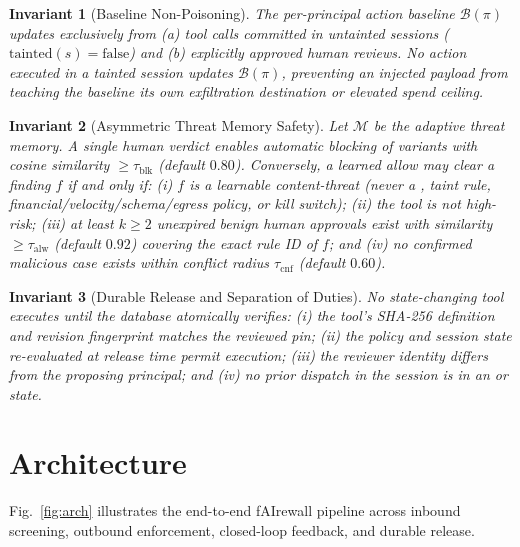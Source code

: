\documentclass[conference]{IEEEtran}
\newtheorem{invariant}{Invariant}
\begin{document}
\begin{invariant}[Baseline Non-Poisoning]
The per-principal action baseline $\mathcal{B}(\pi)$ updates exclusively from (a) tool calls committed in untainted sessions ($\text{tainted}(s) = \text{false}$) and (b) explicitly approved human reviews. No action executed in a tainted session updates $\mathcal{B}(\pi)$, preventing an injected payload from teaching the baseline its own exfiltration destination or elevated spend ceiling.
\end{invariant}

\begin{invariant}[Asymmetric Threat Memory Safety]
Let $\mathcal{M}$ be the adaptive threat memory. A single human  verdict enables automatic blocking of variants with cosine similarity $\ge \tau_{\text{blk}}$ (default $0.80$). Conversely, a learned allow may clear a finding $f$ if and only if: (i) $f$ is a learnable content-threat  (never a , taint rule, financial/velocity/schema/egress policy, or kill switch); (ii) the tool is not high-risk; (iii) at least $k \ge 2$ unexpired benign human approvals exist with similarity $\ge \tau_{\text{alw}}$ (default $0.92$) covering the exact rule ID of $f$; and (iv) no confirmed malicious case exists within conflict radius $\tau_{\text{cnf}}$ (default $0.60$).
\end{invariant}

\begin{invariant}[Durable Release and Separation of Duties]
No state-changing tool executes until the database atomically verifies: (i) the tool's SHA-256 definition and revision fingerprint matches the reviewed pin; (ii) the policy and session state re-evaluated at release time permit execution; (iii) the reviewer identity differs from the proposing principal; and (iv) no prior dispatch in the session is in an  or  state.
\end{invariant}

\section{Architecture}

Fig.~\ref{fig:arch} illustrates the end-to-end fAIrewall pipeline across inbound screening, outbound enforcement, closed-loop feedback, and durable release.
\end{document}
